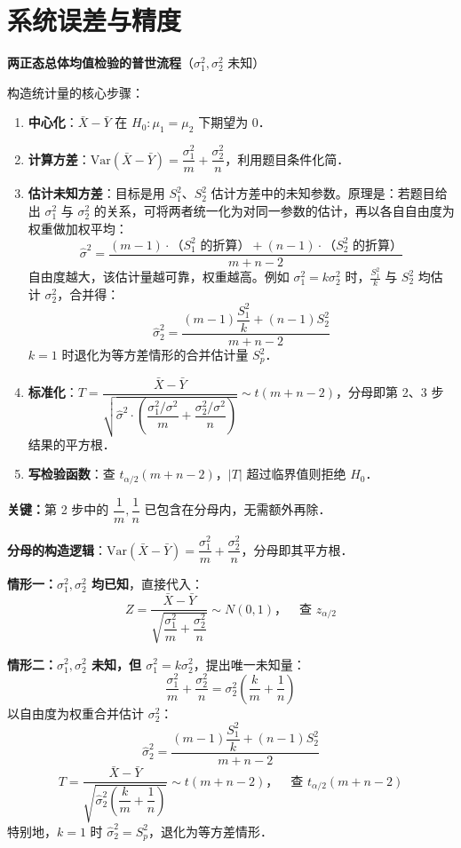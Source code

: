 \section{系统误差与精度}
\begin{note}
\textbf{两正态总体均值检验的普世流程}（$\sigma_1^2, \sigma_2^2$ 未知）

构造统计量的核心步骤：
\begin{enumerate}
    \item \textbf{中心化}：$\bar{X} - \bar{Y}$ 在 $H_0: \mu_1=\mu_2$ 下期望为 0．
    \item \textbf{计算方差}：$\text{Var}(\bar{X}-\bar{Y}) = \dfrac{\sigma_1^2}{m}+\dfrac{\sigma_2^2}{n}$，利用题目条件化简．
    \item \textbf{估计未知方差}：目标是用 $S_1^2$、$S_2^2$ 估计方差中的未知参数。原理是：若题目给出 $\sigma_1^2$ 与 $\sigma_2^2$ 的关系，可将两者统一化为对同一参数的估计，再以各自自由度为权重做加权平均：
    \[
    \hat{\sigma}^2 = \frac{(m-1)\cdot\text{（}S_1^2\text{ 的折算）} + (n-1)\cdot\text{（}S_2^2\text{ 的折算）}}{m+n-2}
    \]
    自由度越大，该估计量越可靠，权重越高。例如 $\sigma_1^2 = k\sigma_2^2$ 时，$\frac{S_1^2}{k}$ 与 $S_2^2$ 均估计 $\sigma_2^2$，合并得：
    \[
    \hat{\sigma}_2^2 = \frac{(m-1)\dfrac{S_1^2}{k}+(n-1)S_2^2}{m+n-2}
    \]
    $k=1$ 时退化为等方差情形的合并估计量 $S_p^2$．
    \item \textbf{标准化}：$T = \dfrac{\bar{X}-\bar{Y}}{\sqrt{\hat{\sigma}^2 \cdot\left(\dfrac{\sigma_1^2/\sigma^2}{m}+\dfrac{\sigma_2^2/\sigma^2}{n}\right)}} \sim t(m+n-2)$，分母即第 2、3 步结果的平方根．
    \item \textbf{写检验函数}：查 $t_{\alpha/2}(m+n-2)$，$|T|$ 超过临界值则拒绝 $H_0$．
\end{enumerate}

\textbf{关键：}第 2 步中的 $\dfrac{1}{m}, \dfrac{1}{n}$ 已包含在分母内，无需额外再除．
\end{note} 
\begin{dxtips}
\textbf{分母的构造逻辑}：$\text{Var}(\bar{X}-\bar{Y}) = \dfrac{\sigma_1^2}{m}+\dfrac{\sigma_2^2}{n}$，分母即其平方根．

\textbf{情形一：$\sigma_1^2, \sigma_2^2$ 均已知}，直接代入：
$$Z = \frac{\bar{X}-\bar{Y}}{\sqrt{\dfrac{\sigma_1^2}{m}+\dfrac{\sigma_2^2}{n}}} \sim N(0,1)，\quad \text{查 } z_{\alpha/2}$$

\textbf{情形二：$\sigma_1^2, \sigma_2^2$ 未知，但 $\sigma_1^2 = k\sigma_2^2$}，提出唯一未知量：
$$\frac{\sigma_1^2}{m}+\frac{\sigma_2^2}{n} = \sigma_2^2\left(\frac{k}{m}+\frac{1}{n}\right)$$
以自由度为权重合并估计 $\sigma_2^2$：
$$\hat{\sigma}_2^2 = \frac{(m-1)\dfrac{S_1^2}{k}+(n-1)S_2^2}{m+n-2}$$
$$T = \frac{\bar{X}-\bar{Y}}{\sqrt{\hat{\sigma}_2^2\left(\dfrac{k}{m}+\dfrac{1}{n}\right)}} \sim t(m+n-2)，\quad \text{查 } t_{\alpha/2}(m+n-2)$$
特别地，$k=1$ 时 $\hat{\sigma}_2^2 = S_p^2$，退化为等方差情形．
\end{dxtips}
